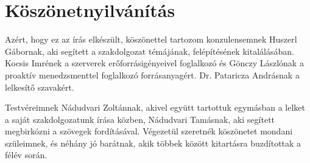 \chapter*{Köszönetnyilvánítás}


Azért, hogy ez az írás elkészült, köszönettel tartozom konzulensemnek Huszerl Gábornak, aki segített a szakdolgozat témájának, felépítésének kitalálásában. Kocsis Imrének a szerverek erőforrásigényeivel foglalkozó és Gönczy Lászlónak a proaktív menedzsmenttel foglalkozó forrásanyagért. Dr. Pataricza Andrásnak a lelkesítő szavakért.

Testvéreimnek Nádudvari Zoltánnak, akivel együtt tartottuk egymásban a lelket a saját szakdolgozatunk írása közben, Nádudvari Tamásnak, aki segített megbirkózni a szövegek fordításával. Végezetül szeretnék köszönetet mondani szüleimnek, és néhány jó barátnak, akik többek között kitartásra buzdítottak a félév során. 